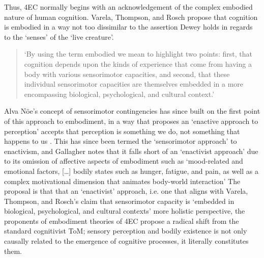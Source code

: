Thus, 4EC normally begins with an acknowledgement of the complex embodied nature of human cognition. Varela, Thompson, and Rosch propose that cognition is embodied in a way not too dissimilar to the assertion Dewey holds in regards to the `senses' of the `live creature'.
\begin{quote}
    `By using the term embodied we mean to highlight two points: first, that cognition depends upon the kinds of experience that come from having a body with various sensorimotor capacities, and second, that these individual sensorimotor capacities are themselves embedded in a more encompassing biological, psychological, and cultural context.' \citeyearpar[pp. 172-173]{varela1993}
\end{quote}
Alva Nöe's concept of sensorimotor contingencies has since built on the first point of this approach to embodiment, in a way that proposes an `enactive approach to perception' accepts that perception is something we do, not something that happens to us \citep{noe2004}. This has since been termed the `sensorimotor approach' to enactivism, and Gallagher notes that it falls short of an `enactivist approach' due to its omission of affective aspects of embodiment such as `mood-related and emotional factors, […] bodily states such as hunger, fatigue, and pain, as well as a complex motivational dimension that animates body-world interaction' \citep[p. 150]{gallagher2017} The proposal is that that an `enactivist' approach, i.e. one that aligns with Varela, Thompson, and Rosch's claim that sensorimotor capacity is `embedded in biological, psychological, and cultural contexts' more holistic perspective, the proponents of embodiment theories of 4EC propose a radical shift from the standard cognitivist ToM; sensory perception and bodily existence is not only causally related to the emergence of cognitive processes, it literally constitutes them. 

